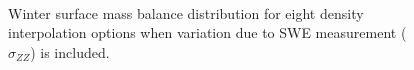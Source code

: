 \documentclass[12pt]{article}
\begin{document}
\begin{figure}[H]
	\centering
	\\
	\caption{Winter surface mass balance distribution for eight density interpolation options when variation due to SWE measurement ( $\sigma_{ZZ}$) is included. }
	\label{fig:WSMB_Distributionzz}
\end{figure}
\end{document}

